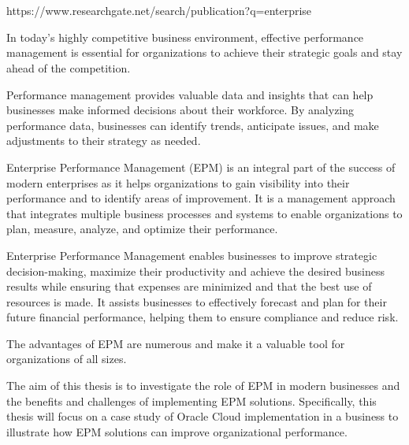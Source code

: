 \documentclass[12pt,a4paper,openright,twoside]{book}
\begin{document}
\tableofcontents   

\mainmatter

\chapter{\introductionname}
\label{chap:introduction}

https://www.researchgate.net/search/publication?q=enterprise%

In today's highly competitive business environment, effective performance management is essential for organizations to achieve their strategic goals and stay ahead of the competition.

Performance management provides valuable data and insights that can help businesses make informed decisions about their workforce. 
%
By analyzing performance data, businesses can identify trends, anticipate issues, and make adjustments to their strategy as needed.

Enterprise Performance Management (EPM) is an integral part of the success of modern enterprises as it helps organizations to gain visibility into their performance and to identify areas of improvement.
%
It is a management approach that integrates multiple business processes and systems to enable organizations to plan, measure, analyze, and optimize their performance.

 Enterprise Performance Management enables businesses to improve strategic decision-making, maximize their productivity and achieve the desired business results while ensuring that expenses are minimized and that the best use of resources is made.
 It assists businesses to effectively forecast and plan for their future financial performance, helping them to ensure compliance and reduce risk. 
 
 The advantages of EPM are numerous and make it a valuable tool for organizations of all sizes.

 The aim of this thesis is to investigate the role of EPM in modern businesses and the benefits and challenges of implementing EPM solutions. 
 Specifically, this thesis will focus on a case study of Oracle Cloud implementation in a business to illustrate how EPM solutions can improve organizational performance. 
 
\end{document}
